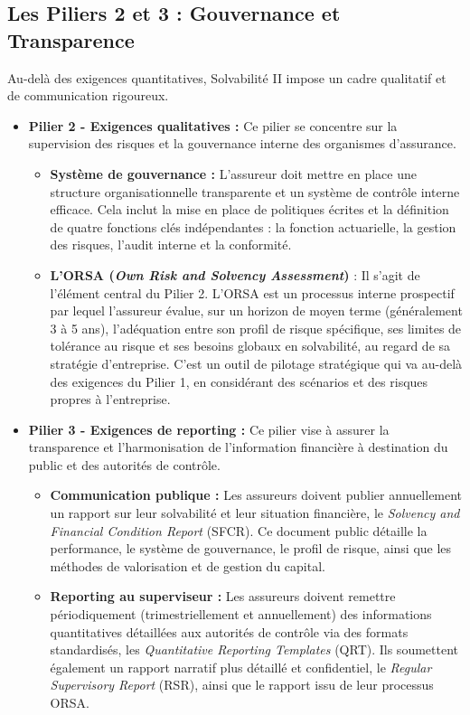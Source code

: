 \subsection{Les Piliers 2 et 3 : Gouvernance et Transparence}
Au-delà des exigences quantitatives, Solvabilité II impose un cadre qualitatif et de communication rigoureux.
\begin{itemize}
    \item \textbf{Pilier 2 - Exigences qualitatives :} Ce pilier se concentre sur la supervision des risques et la gouvernance interne des organismes d'assurance.
    \begin{itemize}
        \item \textbf{Système de gouvernance :} L'assureur doit mettre en place une structure organisationnelle transparente et un système de contrôle interne efficace. \newline{} Cela inclut la mise en place de politiques écrites et la définition de quatre fonctions clés indépendantes : la fonction actuarielle, la gestion des risques, l'audit interne et la conformité.
        \item \textbf{L'ORSA (\textit{Own Risk and Solvency Assessment})} : Il s'agit de l'élément central du Pilier 2. L'ORSA est un processus interne prospectif par lequel l'assureur évalue, sur un horizon de moyen terme (généralement 3 à 5 ans), l'adéquation entre son profil de risque spécifique, ses limites de tolérance au risque et ses besoins globaux en solvabilité, au regard de sa stratégie d'entreprise. \newline{} C'est un outil de pilotage stratégique qui va au-delà des exigences du Pilier 1, en considérant des scénarios et des risques propres à l'entreprise.
    \end{itemize}
    \item \textbf{Pilier 3 - Exigences de reporting :} Ce pilier vise à assurer la transparence et l'harmonisation de l'information financière à destination du public et des autorités de contrôle.
    \begin{itemize}
        \item \textbf{Communication publique :} Les assureurs doivent publier annuellement un rapport sur leur solvabilité et leur situation financière, le \textit{Solvency and Financial Condition Report} (SFCR). Ce document public détaille la performance, le système de gouvernance, le profil de risque, ainsi que les méthodes de valorisation et de gestion du capital.
        \item \textbf{Reporting au superviseur :} Les assureurs doivent remettre périodiquement (trimestriellement et annuellement) des informations quantitatives détaillées aux autorités de contrôle via des formats standardisés, les \textit{Quantitative Reporting Templates} (QRT). \newline{} Ils soumettent également un rapport narratif plus détaillé et confidentiel, le \textit{Regular Supervisory Report} (RSR), ainsi que le rapport issu de leur processus ORSA.
    \end{itemize}
\end{itemize}


